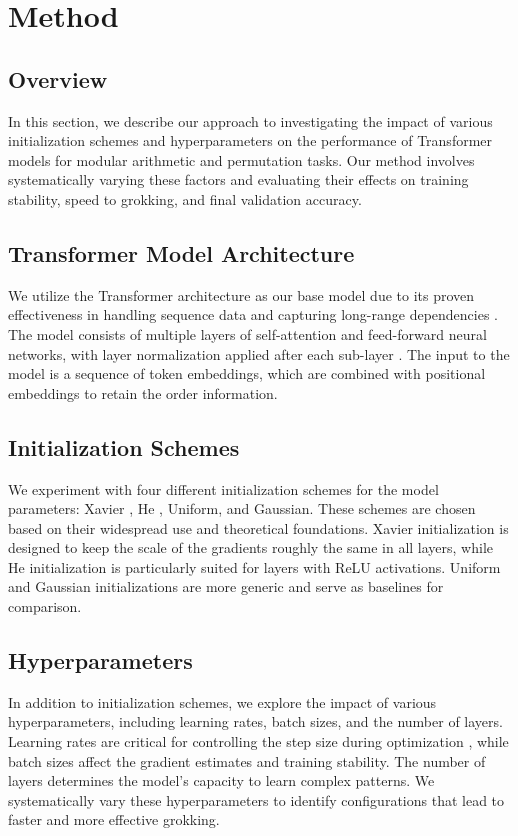\documentclass{article} %
\begin{document}
\section{Method}
\label{sec:method}

\subsection{Overview}
In this section, we describe our approach to investigating the impact of various initialization schemes and hyperparameters on the performance of Transformer models for modular arithmetic and permutation tasks. Our method involves systematically varying these factors and evaluating their effects on training stability, speed to grokking, and final validation accuracy.

\subsection{Transformer Model Architecture}
We utilize the Transformer architecture as our base model due to its proven effectiveness in handling sequence data and capturing long-range dependencies \citep{vaswani2017attention}. The model consists of multiple layers of self-attention and feed-forward neural networks, with layer normalization applied after each sub-layer \citep{ba2016layer}. The input to the model is a sequence of token embeddings, which are combined with positional embeddings to retain the order information.

\subsection{Initialization Schemes}
We experiment with four different initialization schemes for the model parameters: Xavier \citep{Glorot2010UnderstandingTD}, He \citep{He2015DelvingDI}, Uniform, and Gaussian. These schemes are chosen based on their widespread use and theoretical foundations. Xavier initialization is designed to keep the scale of the gradients roughly the same in all layers, while He initialization is particularly suited for layers with ReLU activations. Uniform and Gaussian initializations are more generic and serve as baselines for comparison.

\subsection{Hyperparameters}
In addition to initialization schemes, we explore the impact of various hyperparameters, including learning rates, batch sizes, and the number of layers. Learning rates are critical for controlling the step size during optimization \citep{kingma2014adam}, while batch sizes affect the gradient estimates and training stability. The number of layers determines the model's capacity to learn complex patterns. We systematically vary these hyperparameters to identify configurations that lead to faster and more effective grokking.
\end{document}
